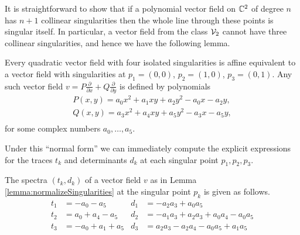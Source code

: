 \documentclass[phd,tocprelim]{cornell}
\begin{document}
\begin{remark}
It is straightforward to show that if a polynomial vector field on $\mathbb{C}^2$ of degree $n$ has $n+1$ collinear singularities then the whole line through these points is singular itself. In particular, a vector field from the class $\mathcal{V}_2$ cannot have three collinear singularities, and hence we have the following lemma.
\end{remark}


\begin{lemma}\label{lemma:normalizeSingularities}
 Every quadratic vector field with four isolated singularities is affine equivalent to a vector field with singularities at $p_1=(0,0)$, $p_2=(1,0)$, $p_3=(0,1)$. Any such vector field $v=P\frac{\partial}{\partial x}+Q\frac{\partial}{\partial y}$ is defined by polynomials
\begin{equation}\label{eq:coefficients}
\begin{array}{l} 
 P(x,y) = a_0x^2+a_1xy+a_2y^2-a_0x-a_2y,  \\ 
 Q(x,y) = a_3x^2+a_4xy+a_5y^2-a_3x-a_5y, \\
\end{array}
\end{equation}
for some complex numbers $a_0,\ldots,a_5$.
\end{lemma}

Under this ``normal form'' we can immediately compute the explicit expressions for the traces $t_k$ and determinants $d_k$ at each singular point $p_1,p_2,p_3$.

\begin{lemma}\label{lemma:expressionsSpectra}
 The spectra $(t_k,d_k)$ of a vector field $v$ as in Lemma \ref{lemma:normalizeSingularities} at the singular point $p_k$ is given as follows.
 \begin{align*}
  t_1 &= -a_0-a_5  	& d_1 &= -a_2a_3+a_0a_5 \\
  t_2 &= a_0+a_4-a_5  	& d_2 &= -a_1a_3+a_2a_3+a_0a_4-a_0a_5 \\
  t_3 &= -a_0+a_1+a_5  	& d_3 &= a_2a_3-a_2a_4-a_0a_5+a_1a_5 
 \end{align*}
\end{lemma}
\end{document}
